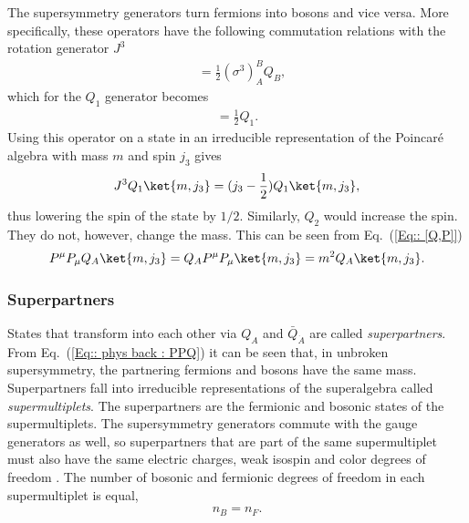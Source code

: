 \documentclass[twoside,english]{uiofysmaster}
\begin{document}
The supersymmetry generators turn fermions into bosons and vice versa. More specifically, these operators have the following commutation relations with the rotation generator $J^3$
\begin{align}
[ Q_A, J^3] &= \frac{1}{2} (\sigma^3)_A^BQ_B, 
\end{align}
which for the $Q_1$ generator becomes
\begin{align}
[Q_1, J^3] = \frac{1}{2} Q_1.
\end{align}
Using this operator on a state in an irreducible representation of the Poincar\'{e} algebra with mass $m$ and spin $j_3$ gives
\begin{align}
J^3 Q_1 \ket{m, j_3} = (j_3 - \frac{1}{2}) Q_1 \ket{m, j_3},
\end{align}
thus lowering the spin of the state by $1/2$. Similarly, $Q_2$ would increase the spin. They do not, however, change the mass. This can be seen from Eq.\ (\ref{Eq:: [Q,P]})
\begin{align}\label{Eq:: phys back : PPQ}
P^{\mu} P_{\mu} Q_A \ket{m, j_3} = Q_A P^{\mu} P_{\mu} \ket{m, j_3} = m^2 Q_A \ket{m, j_3}.
\end{align}

\subsubsection{Superpartners}\label{Sec:: phys back : Superpartners}

States that transform into each other via $Q_A$ and $\bar{Q}_{\dot{A}}$ are called \textit{superpartners}. From Eq.~(\ref{Eq:: phys back : PPQ}) it can be seen that, in unbroken supersymmetry, the partnering fermions and bosons have the same mass. Superpartners fall into irreducible representations of the superalgebra called \textit{supermultiplets}. The superpartners are the fermionic and bosonic states of the supermultiplets. The supersymmetry generators commute with the gauge generators as well, so superpartners that are part of the same supermultiplet must also have the same electric charges, weak isospin and color degrees of freedom \cite{martin2010supersymmetry}. The number of bosonic and fermionic degrees of freedom in each supermultiplet is equal,
\begin{align}\label{Eq:: pysh back : nB=nF}
n_B = n_F.
\end{align}
\end{document}
